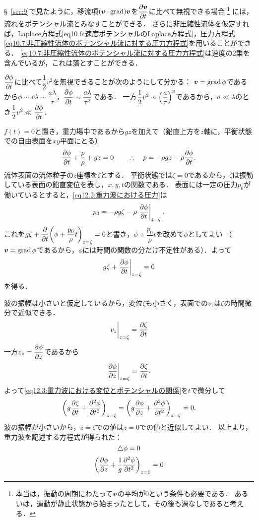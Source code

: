 \S~\ref{sec:9}で見たように，移流項$(\vb*{v}\cdot\operatorname{grad})\vb*{v}$を$\dpdv{\v}{t}$に比べて無視できる場合
\footnote{本当は，振動の周期にわたって$\vb*{v}$の平均が0という条件も必要である．
あるいは，運動が静止状態から始まったとして，その後も渦なしであると考える．}
には，流れをポテンシャル流とみなすことができる．
さらに非圧縮性流体を仮定すれば，Laplace方程式\eqref{eq10.6:速度ポテンシャルのLaplace方程式}，圧力方程式\eqref{eq10.7:非圧縮性流体のポテンシャル流に対する圧力方程式}を用いることができる．
\eqref{eq10.7:非圧縮性流体のポテンシャル流に対する圧力方程式}は速度の2乗を含んでいるが，これは落とすことができる．
\begin{details}
$\dpdv{\phi}{t}$に比べて$\dfrac{1}{2}v^2$を無視できることが次のようにして分かる：
$\vb*{v}=\operatorname{grad}\phi$であるから$\phi\sim v\lambda \sim \dfrac{a\lambda}{\tau}$，$\dpdv{\phi}{t}\sim\dfrac{a\lambda}{\tau^2}$である．
一方$\dfrac{1}{2}v^2 \sim \pqty{\dfrac{a}{\tau}}^2$であるから，$a\ll\lambda$のとき$\dfrac{1}{2}v^2 \ll \dpdv{\phi}{t}$．
\end{details}
\noindent
$f(t)=0$と置き，重力場中であるから$gz$を加えて（鉛直上方を$z$軸に，平衡状態での自由表面を$xy$平面にとる）
\begin{equation}\label{eq12.2:重力波における圧力}
    \pdv{\phi}{t} + \frac{p}{\rho} + gz = 0
    \qquad\therefore\quad p = -\rho gz - \rho\pdv{\phi}{t} .
\end{equation}
流体表面の流体粒子の$z$座標を$\zeta$とする．
平衡状態では$\zeta=0$であるから，$\zeta$は振動している表面の鉛直変位を表し，$x,y,t$の関数である．
表面には一定の圧力$p_0$が働いているとすると，\eqref{eq12.2:重力波における圧力}は
\[
    p_0 = -\rho g\zeta - \rho \eval{\pdv{\phi}{t}}_{z=\zeta} .
\]
これを$g\zeta + \dpdv{t} \pqty{\phi+\dfrac{p_0}{\rho}t}_{z=\zeta} = 0$と書き，$\phi+\dfrac{p_0}{\rho}t$を改めて$\phi$としてよい
（$\vb*{v}=\operatorname{grad}\phi$であるから，$\phi$には時間の関数の分だけ不定性がある）．よって
\begin{equation}\label{eq12.3:重力波における変位とポテンシャルの関係}
    g\zeta + \eval{\pdv{\phi}{t}}_{z=\zeta} = 0
\end{equation}
を得る．



波の振幅は小さいと仮定しているから，変位$\zeta$も小さく，表面での$v_z$は$\zeta$の時間微分で近似できる．
\[
    \eval{v_z}_{z=\zeta} = \pdv{\zeta}{t}
\]
一方$v_z=\dpdv{\phi}{z}$であるから
\[
    \eval{\pdv{\phi}{z}}_{z=\zeta} = \pdv{\zeta}{t} .
\]
よって\eqref{eq12.3:重力波における変位とポテンシャルの関係}を$t$で微分して
\[
    \pqty{ g\pdv{\zeta}{t} + \pdv[2]{\phi}{t} }_{z=\zeta} = \pqty{ g\pdv{\phi}{z} + \pdv[2]{\phi}{t} }_{z=\zeta} = 0 .
\]
波の振幅が小さいから，$z=\zeta$での値は$z=0$での値と近似してよい．
以上より，重力波を記述する方程式が得られた：
\begin{equation}\label{eq12.4:重力波でのLaplace方程式}
    \triangle\phi = 0
\end{equation}
\begin{equation}\label{eq12.5:重力波の表面での境界条件}
    \pqty{ \pdv{\phi}{z} + \frac{1}{g} \pdv[2]{\phi}{t} }_{z=0} = 0
\end{equation}


